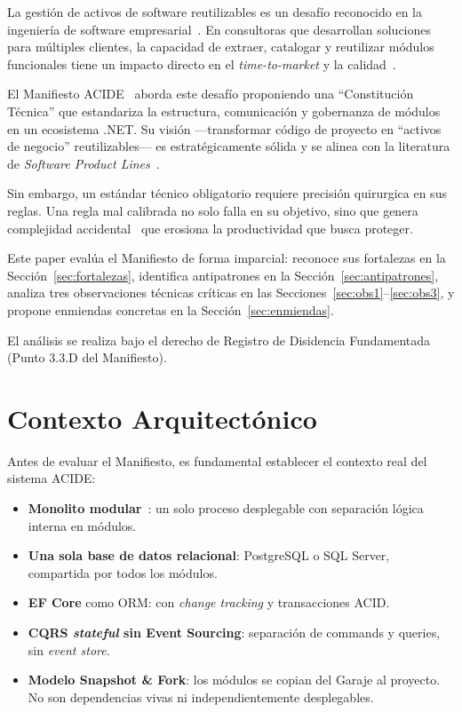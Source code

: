 \documentclass[conference]{IEEEtran}
\begin{document}
La gesti\'on de activos de software reutilizables es un desaf\'io reconocido en la ingenier\'ia de software empresarial~\cite{krueger1992}. En consultoras que desarrollan soluciones para m\'ultiples clientes, la capacidad de extraer, catalogar y reutilizar m\'odulos funcionales tiene un impacto directo en el \textit{time-to-market} y la calidad~\cite{morisio2002}.

El Manifiesto ACIDE~\cite{acide2026} aborda este desaf\'io proponiendo una ``Constituci\'on T\'ecnica'' que estandariza la estructura, comunicaci\'on y gobernanza de m\'odulos en un ecosistema .NET. Su visi\'on ---transformar c\'odigo de proyecto en ``activos de negocio'' reutilizables--- es estrat\'egicamente s\'olida y se alinea con la literatura de \textit{Software Product Lines}~\cite{pohl2005}.

Sin embargo, un est\'andar t\'ecnico obligatorio requiere precisi\'on quirurgica en sus reglas. Una regla mal calibrada no solo falla en su objetivo, sino que genera complejidad accidental~\cite{brooks1987} que erosiona la productividad que busca proteger.

Este paper eval\'ua el Manifiesto de forma imparcial: reconoce sus fortalezas en la Secci\'on~\ref{sec:fortalezas}, identifica antipatrones en la Secci\'on~\ref{sec:antipatrones}, analiza tres observaciones t\'ecnicas cr\'iticas en las Secciones~\ref{sec:obs1}--\ref{sec:obs3}, y propone enmiendas concretas en la Secci\'on~\ref{sec:enmiendas}.

El an\'alisis se realiza bajo el derecho de Registro de Disidencia Fundamentada (Punto 3.3.D del Manifiesto).


\section{Contexto Arquitect\'onico}
\label{sec:contexto}

Antes de evaluar el Manifiesto, es fundamental establecer el contexto real del sistema ACIDE:

\begin{itemize}[leftmargin=1.5em, itemsep=2pt]
    \item \textbf{Monolito modular}~\cite{newman2019}: un solo proceso desplegable con separaci\'on l\'ogica interna en m\'odulos.
    \item \textbf{Una sola base de datos relacional}: PostgreSQL o SQL Server, compartida por todos los m\'odulos.
    \item \textbf{EF Core} como ORM: con \textit{change tracking} y transacciones ACID.
    \item \textbf{CQRS \textit{stateful} sin Event Sourcing}: separaci\'on de commands y queries, sin \textit{event store}.
    \item \textbf{Modelo Snapshot \& Fork}: los m\'odulos se copian del Garaje al proyecto. No son dependencias vivas ni independientemente desplegables.
\end{itemize}
\end{document}
